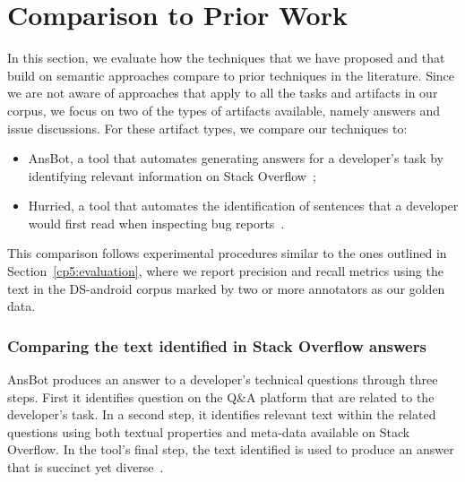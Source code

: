 \section{Comparison to Prior Work}
\label{cp5:comparison}



In this section, we evaluate how the techniques that we have proposed and that build on semantic approaches
compare to prior techniques in the literature. Since we are not aware of approaches that 
apply to all the tasks and artifacts in our corpus, we focus on two of the types of artifacts available, 
namely  answers and  issue discussions.
For these artifact types, we compare our techniques to: 



\begin{itemize}
    \item \acf{AnsBot}, a tool that automates generating answers for a developer's task by identifying relevant information on Stack Overflow~\cite{Xu2017};
    \item \acf{Hurried}, a tool that automates the identification of sentences that a developer would first read when inspecting bug reports~\cite{Lotufo2012}.
\end{itemize}



This comparison follows experimental procedures similar to the ones outlined in Section~\ref{cp5:evaluation},
where we report precision and recall metrics using the text in the \acs{DS-android} corpus marked by two or more annotators
as our golden data.




\subsubsection{Comparing the text identified in Stack Overflow answers}
\label{cp5:comparison-answerbot}


\acs{AnsBot} produces an answer to a developer's technical questions through three steps. 
First it identifies question on the Q\&A platform that are related to the developer's task. 
In a second step, it identifies relevant text within the related questions
using both textual properties and meta-data available on Stack Overflow. 
In the tool's final step, the text identified is used to produce an answer that is succinct yet diverse~\cite{Xu2017}.


